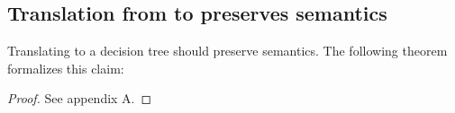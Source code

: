 \documentclass[manuscript,screen,review, 12pt, nonacm]{acmart}
\begin{document}





    \subsection{Translation from \VMinus to \D preserves semantics}
    
    Translating \iffibf to a decision tree should preserve semantics. The
    following theorem formalizes this claim: 

    \begin{proof}
        See appendix A. 
    \end{proof}
\end{document}
